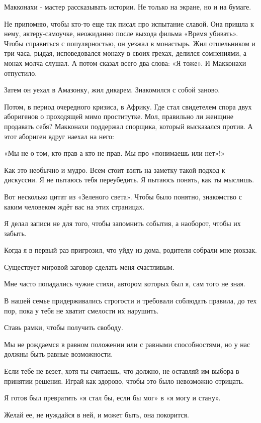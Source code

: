 Макконахи - мастер рассказывать истории. Не только на экране, но и на бумаге.

Не припомню, чтобы кто-то еще так писал про испытание славой. Она пришла к
нему, актеру-самоучке, неожиданно после выхода фильма «Время убивать». Чтобы
справиться с популярностью, он уезжал в монастырь. Жил отшельником и три часа,
рыдая, исповедовался монаху в своих грехах, делился сомнениями, а монах молча
слушал. А потом сказал всего два слова: «Я тоже». И Макконахи отпустило. 

Затем он уехал в Амазонку, жил дикарем. Знакомился с собой заново. 

Потом, в период очередного кризиса, в Африку. Где стал свидетелем спора двух
аборигенов о проходящей мимо проститутке. Мол, правильно ли женщине продавать
себя? Макконахи поддержал спорщика, который высказался против. А этот абориген
вдруг наехал на него:

«Мы не о том, кто прав а кто не прав. Мы про «понимаешь или нет»!»

Как это необычно и мудро. Всем стоит взять на заметку такой подход к дискуссии.
Я не пытаюсь тебя переубедить. Я пытаюсь понять, как ты мыслишь. 

Вот несколько цитат из «Зеленого света». Чтобы было понятно, знакомство с каким
человеком ждёт вас на этих страницах. 

Я делал записи не для того, чтобы запомнить события, а наоборот, чтобы их
забыть. 

Когда я в первый раз пригрозил, что уйду из дома, родители собрали мне рюкзак. 

Существует мировой заговор сделать меня счастливым. 

Мне часто попадались чужие стихи, автором которых был я, сам того не зная. 

В нашей семье придерживались строгости и требовали соблюдать правила, до тех
пор, пока у тебя не хватит смелости их нарушить. 

Ставь рамки, чтобы получить свободу. 

Мы не рождаемся в равном положении или с равными способностями, но у нас должны
быть равные возможности.

Если тебе не везет, хотя ты считаешь, что должно, не оставляй им выбора в
принятии решения. Играй как здорово, чтобы это было невозможно отрицать. 

Я готов был превратить «я стал бы, если бы мог» в «я могу и стану».

Желай ее, не нуждайся в ней, и может быть, она покорится. 

